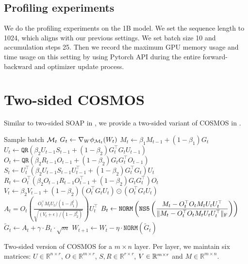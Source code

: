 \subsection{Profiling experiments}
We do the profiling experiments on the 1B model. We set the sequence length to 1024, which aligns with our previous settings. We set batch size 10 and accumulation steps 25. Then we record the maximum GPU memory usage and time usage on this setting by using Pytorch API during the entire forward-backward and optimizer update process.



\section{Two-sided COSMOS}\label{sec:COSMOS-two-side}
Similar to two-sided SOAP in \citet{vyas2024soap}, we provide a two-sided variant of COSMOS in . 

\begin{algorithm}[htb!]
	\begin{algorithmic}[1]
		\STATE Sample batch $\mathcal{M}_t$
		\STATE $G_t \gets \nabla_W \phi_{\mathcal{M}_t}(W_t)$
        \STATE $M_t \gets \beta_1M_{t-1}+(1-\beta_1)G_t$
        \STATE $U_t \gets \texttt{QR}(\beta_2U_{t-1}S_{t-1}+(1-\beta_2)G_t^\top G_tU_{t-1})$
        \STATE $O_t \gets \texttt{QR}(\beta_2R_{t-1}O_{t-1}+(1-\beta_2)G_t G_t^\top O_{t-1})$
        \STATE $S_t \gets U_t^\top(\beta_2 U_{t-1}S_{t-1}U_{t-1}^\top + (1-\beta_2)G_t^\top G_t)U_t$
        \STATE $R_t \gets O_t^\top(\beta_2 O_{t-1}R_{t-1}O_{t-1}^\top + (1-\beta_2)G_t G_t^\top)O_t$
		\STATE $V_t \gets \beta_2 V_{t-1} + (1-\beta_2) (O_t^\top G_tU_t) \odot (O_t^\top G_tU_t)$
		\STATE $\displaystyle A_t = O_t\left(\frac{O_t^\top M_tU_t/(1-\beta_1^t)}{\sqrt{(V_t+\epsilon)/(1-\beta_2^t)}}\right)U_t^\top$
        \STATE $\displaystyle B_t \gets \texttt{NORM} \left(\texttt{NS5}\left(\frac{M_t-O_t^\top O_t M_tU_tU_t^\top}{\|M_t-O_t^\top O_t M_tU_tU_t^\top\|_{\rm F}}\right)\right)$
        \STATE $\displaystyle \tilde{G}_t \gets A_t + \gamma \cdot B_t\cdot\sqrt{m}$ 
		\STATE $\displaystyle W_{t+1} \gets W_{t} -\eta \cdot\texttt{NORM}(\tilde{G}_t)$
        \ENDFOR
	\end{algorithmic}
	\caption{Two-sided version of COSMOS for a $m \times n$ layer. Per layer, we maintain six matrices: $U \in \mathbb{R}^{n \times r}$, $O\in\mathbb{R}^{m \times r}$, $S,R\in \mathbb{R}^{r \times r}$, $V\in\mathbb{R}^{m\times r}$ and $M \in \mathbb{R}^{m \times n}$.}
	\label{alg:COSMOS-two-side}
\end{algorithm}

